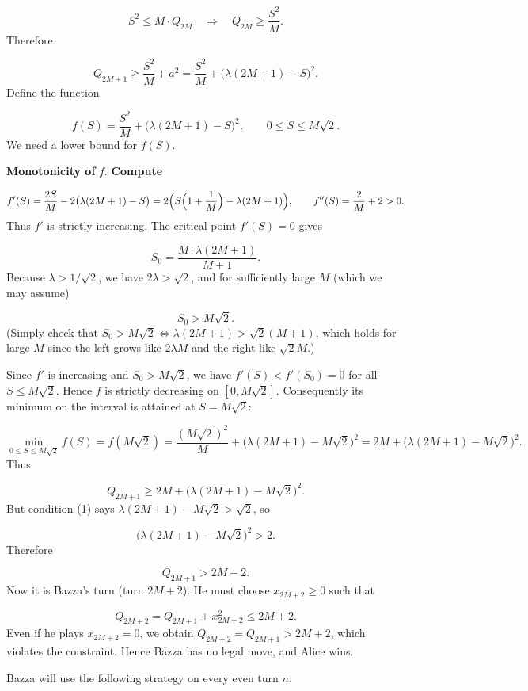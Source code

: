\[
S^2 \le M\cdot Q_{2M} \quad\Longrightarrow\quad Q_{2M} \ge \frac{S^2}{M}.
\]
Therefore\par
\[
Q_{2M+1} \ge \frac{S^2}{M} + a^2 = \frac{S^2}{M} + \bigl(\lambda(2M+1)-S\bigr)^2.
\]
Define the function\par
\[
f(S) = \frac{S^2}{M} + \bigl(\lambda(2M+1)-S\bigr)^2, \qquad 0\le S\le M\sqrt{2}.
\]
We need a lower bound for \(f(S)\).\par
\textbf{Monotonicity of }\(f\).\textbf{ Compute}\par
\[
f'(S) = \frac{2S}{M} - 2\bigl(\lambda(2M+1)-S\bigr) = 2\Bigl( S\Bigl(1+\frac{1}{M}\Bigr) - \lambda(2M+1)\Bigr), \qquad f''(S)=\frac{2}{M}+2>0.
\]
Thus \(f'\) is strictly increasing. The critical point \(f'(S)=0\) gives\par
\[
S_0 = \frac{M\cdot \lambda(2M+1)}{M+1}.
\]
Because \(\lambda > 1/\sqrt{2}\), we have \(2\lambda > \sqrt{2}\), and for sufficiently large \(M\) (which we may assume)\par
\[
S_0 > M\sqrt{2}.
\]
(Simply check that \(S_0 > M\sqrt{2} \iff \lambda(2M+1) > \sqrt{2}(M+1)\), which holds for large \(M\) since the left grows like \(2\lambda M\) and the right like \(\sqrt{2} M\).)\par
Since \(f'\) is increasing and \(S_0 > M\sqrt{2}\), we have \(f'(S) < f'(S_0)=0\) for all \(S\le M\sqrt{2}\). Hence \(f\) is strictly decreasing on \([0,M\sqrt{2}]\). Consequently its minimum on the interval is attained at \(S = M\sqrt{2}\):\par
\[
\min_{0\le S\le M\sqrt{2}} f(S) = f(M\sqrt{2}) = \frac{(M\sqrt{2})^2}{M} + \bigl(\lambda(2M+1)-M\sqrt{2}\bigr)^2 = 2M + \bigl(\lambda(2M+1)-M\sqrt{2}\bigr)^2.
\]
Thus\par
\[
Q_{2M+1} \ge 2M + \bigl(\lambda(2M+1)-M\sqrt{2}\bigr)^2.
\]
But condition (1) says \(\lambda(2M+1)-M\sqrt{2} > \sqrt{2}\), so\par
\[
\bigl(\lambda(2M+1)-M\sqrt{2}\bigr)^2 > 2.
\]
Therefore\par
\[
Q_{2M+1} > 2M + 2.
\]
Now it is Bazza's turn (turn \(2M+2\)). He must choose \(x_{2M+2}\ge 0\) such that\par
\[
Q_{2M+2} = Q_{2M+1} + x_{2M+2}^2 \le 2M+2.
\]
Even if he plays \(x_{2M+2}=0\), we obtain \(Q_{2M+2}=Q_{2M+1} > 2M+2\), which violates the constraint. Hence Bazza has no legal move, and Alice wins.\par
\smallskip
{}
Bazza will use the following strategy on every even turn \(n\):\par
